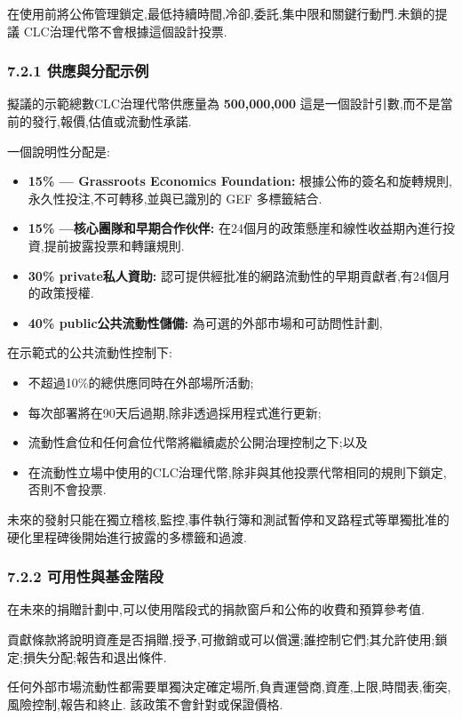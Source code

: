 \documentclass[11pt]{article}
\begin{document}
在使用前將公佈管理鎖定,最低持續時間,冷卻,委託,集中限和關鍵行動門.未鎖的提議 CLC治理代幣不會根據這個設計投票.

\subsubsection*{7.2.1 供應與分配示例}

擬議的示範總數CLC治理代幣供應量為 \textbf{500,000,000} 這是一個設計引數,而不是當前的發行,報價,估值或流動性承諾.

一個說明性分配是:

\begin{itemize}[leftmargin=*]
\item \textbf{15\% --- Grassroots Economics Foundation:} 根據公佈的簽名和旋轉規則,永久性投注,不可轉移,並與已識別的 GEF 多標籤結合.
\item \textbf{15\% ---核心團隊和早期合作伙伴:} 在24個月的政策懸崖和線性收益期內進行投資,提前披露投票和轉讓規則.
\item \textbf{30\%  private私人資助:} 認可提供經批准的網路流動性的早期貢獻者,有24個月的政策授權.
\item \textbf{40\%  public公共流動性儲備:} 為可選的外部市場和可訪問性計劃,
\end{itemize}
在示範式的公共流動性控制下:

\begin{itemize}[leftmargin=*]
\item 不超過10\%的總供應同時在外部場所活動;
\item 每次部署將在90天后過期,除非透過採用程式進行更新;
\item 流動性倉位和任何倉位代幣將繼續處於公開治理控制之下;以及
\item 在流動性立場中使用的CLC治理代幣,除非與其他投票代幣相同的規則下鎖定,否則不會投票.
\end{itemize}
未來的發射只能在獨立稽核,監控,事件執行簿和測試暫停和叉路程式等單獨批准的硬化里程碑後開始進行披露的多標籤和過渡.

\subsubsection*{7.2.2 可用性與基金階段}

在未來的捐贈計劃中,可以使用階段式的捐款窗戶和公佈的收費和預算參考值.

貢獻條款將說明資產是否捐贈,授予,可撤銷或可以償還;誰控制它們;其允許使用;鎖定;損失分配;報告和退出條件.

任何外部市場流動性都需要單獨決定確定場所,負責運營商,資產,上限,時間表,衝突,風險控制,報告和終止. 該政策不會針對或保證價格.
\end{document}
